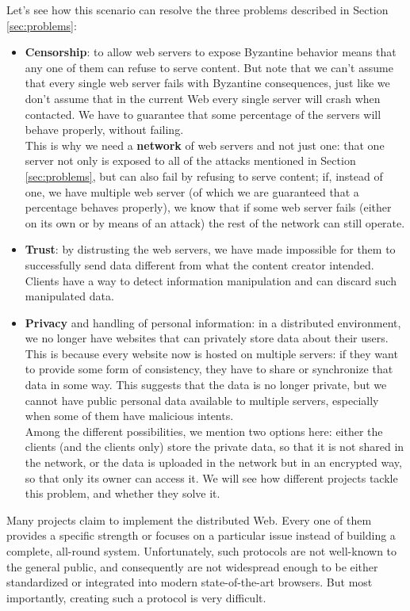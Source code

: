 \documentclass[mscthesis]{usiinfthesis}
\begin{document}
Let's see how this scenario can resolve the three problems described in Section \ref{sec:problems}:
\begin{itemize}
	\item \textbf{Censorship}: to allow web servers to expose Byzantine behavior means that any one of them can refuse to serve content. But note that we can't assume that every single web server  fails with Byzantine consequences, just like we don't assume that in the current Web every single  server will crash when contacted. We have to guarantee that some percentage of the servers will behave properly, without failing.\\
	This is why we need a \textbf{network} of web servers and not just one: that one server not only is exposed to all of the attacks mentioned in Section \ref{sec:problems}, but can also fail by refusing to serve content; if, instead of one, we have multiple web server (of which we are guaranteed that a percentage behaves properly), we know that if some web server fails (either on its own or by means of an attack) the rest of the network can still operate.

	\item \textbf{Trust}: by distrusting the web servers, we have made impossible for them to successfully send data different from what the content creator intended. Clients have a way to detect information manipulation and can discard such manipulated data.

	\item \textbf{Privacy} and handling of personal information: in a distributed environment, we no longer have websites that can privately store data about their users. This is because every website now is hosted on multiple servers: if they want to provide some form of consistency, they have to share or synchronize that data in some way. This suggests that the data is no longer private, but we cannot have public personal data available to multiple servers, especially when some of them have malicious intents.\\
	Among the different possibilities, we mention two options here: either the clients (and the clients only) store the private data, so that it is not shared in the network, or the data is uploaded in the network but in an encrypted way, so that only its owner can access it. We will see how different projects tackle this problem, and whether they solve it.
\end{itemize}

Many projects claim to implement the distributed Web. Every one of them provides a specific strength or focuses on a particular issue instead of building a complete, all-round system.
Unfortunately, such protocols are not well-known to the general public, and consequently are not widespread enough to be either standardized or integrated into modern state-of-the-art browsers.
But most importantly, creating such a protocol is very difficult.
\end{document}
